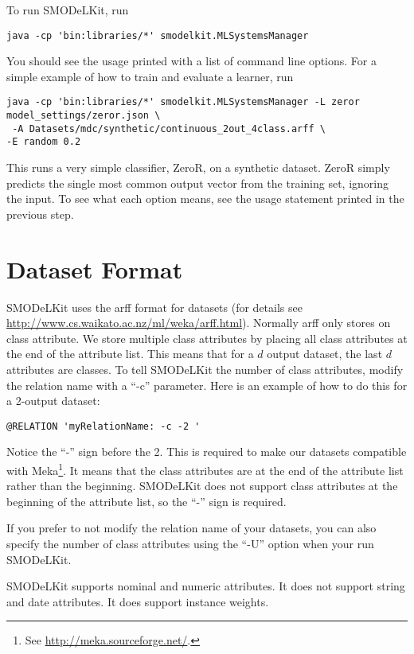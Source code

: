 \documentclass[twoside,11pt]{article}
\begin{document}
To run SMODeLKit, run
\begin{lstlisting}[frame=single]
java -cp 'bin:libraries/*' smodelkit.MLSystemsManager
\end{lstlisting}

You should see the usage printed with a list of command line options. For a simple example of how to train and evaluate a learner, run
\begin{lstlisting}[frame=single]
java -cp 'bin:libraries/*' smodelkit.MLSystemsManager -L zeror model_settings/zeror.json \
 -A Datasets/mdc/synthetic/continuous_2out_4class.arff \
-E random 0.2
\end{lstlisting}

This runs a very simple classifier, ZeroR, on a synthetic dataset. ZeroR simply predicts the single most common output vector from the training set, ignoring the input. To see what each option means, see the usage statement printed in the previous step.

\section{Dataset Format}

SMODeLKit uses the arff format for datasets (for details see \url{http://www.cs.waikato.ac.nz/ml/weka/arff.html}). Normally arff only stores on class attribute. We store multiple class attributes by placing all class attributes at the end of the attribute list. This means that for a $d$ output dataset, the last $d$ attributes are classes. To tell SMODeLKit the number of class attributes, modify the relation name with a ``-c'' parameter. Here is an example of how to do this for a 2-output dataset:

\begin{lstlisting}[frame=single]
@RELATION 'myRelationName: -c -2 '
\end{lstlisting}

Notice the ``-'' sign before the 2. This is required to make our datasets compatible with Meka\footnote{See \url{http://meka.sourceforge.net/}.}. It means that the class attributes are at the end of the attribute list rather than the beginning. SMODeLKit does not support class attributes at the beginning of the attribute list, so the ``-'' sign is required.

If you prefer to not modify the relation name of your datasets, you can also specify the number of class attributes using the ``-U'' option when your run SMODeLKit.

SMODeLKit supports nominal and numeric attributes. It does not support string and date attributes. It does support instance weights.
\end{document}
